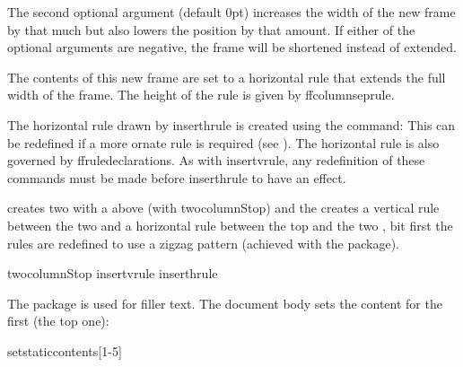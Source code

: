 \documentclass[fontsize=12pt]{scrbook}
\begin{document}
The second optional argument  (default 0pt) increases
the width of the new frame by that much but also lowers the
 position by that amount.  If either of the optional
arguments are negative, the frame will be shortened instead of
extended.

The contents of this new frame are set to a horizontal rule that
extends the full width of the frame.
The height of the rule is given by \gls{ffcolumnseprule}.

The horizontal rule drawn by \gls{inserthrule} is created using 
the command:
This can be redefined if a more ornate rule is required (see 
).
The horizontal rule is also governed by \gls{ffruledeclarations}.
As with \gls{insertvrule}, any redefinition of these commands must
be made before \gls{inserthrule} to have an effect.

 creates two  with a
 above (with \gls{twocolumnStop}) and 
the creates a vertical rule between the two 
and a horizontal rule between the top  and the two
, bit first the rules are redefined to use a
zigzag pattern (achieved with the  package).
\begin{codebox}
\gls{twocolumnStop}\marg{1in}
\gls{insertvrule}
\codepar
{}
\gls{inserthrule}
\end{codebox}

The  package is used for filler text. The document
body sets the content for the first  (the top one):
\begin{codebox}
\gls{setstaticcontents}[1-5]
\end{codebox}
\end{document}

